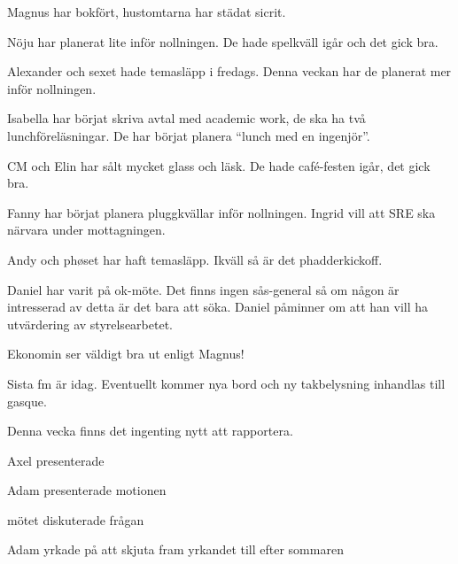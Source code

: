 \documentclass[10pt]{article}
\begin{document}
\begin{paragrafer}
\begin{paragrafer}
            Magnus har bokfört, hustomtarna har städat sicrit.
    
            Nöju har planerat lite inför nollningen. De hade spelkväll igår och det gick bra. 
    
            Alexander och sexet hade temasläpp i fredags. Denna veckan har de planerat mer inför nollningen.
    
            Isabella har börjat skriva avtal med academic work, de ska ha två lunchföreläsningar. De har börjat planera ``lunch med en ingenjör''.
    
            CM och Elin har sålt mycket glass och läsk. De hade café-festen igår, det gick bra.
    
            Fanny har börjat planera pluggkvällar inför nollningen. Ingrid vill att SRE ska närvara under mottagningen.
    
            Andy och phøset har haft temasläpp. Ikväll så är det phadderkickoff.
    
            Daniel har varit på ok-möte. Det finns ingen sås-general så om någon är intresserad av detta är det bara att söka. Daniel påminner om att han vill ha utvärdering av styrelsearbetet.
    
            Ekonomin ser väldigt bra ut enligt Magnus!
            
            
            Sista fm är idag. Eventuellt kommer nya bord och ny takbelysning inhandlas till gasque. 
    
            
            Denna vecka finns det ingenting nytt att rapportera.
            
            
        \end{paragrafer}
        
        Axel presenterade 
    
        \Mbaby
    
    
        Adam presenterade motionen
    
        mötet diskuterade frågan
    
        Adam yrkade på att skjuta fram yrkandet till efter sommaren
    
        

\end{paragrafer}
\end{document}
